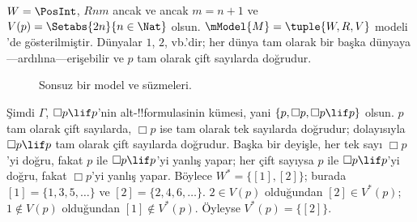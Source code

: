 \documentclass[../../../include/open-logic-section]{subfiles}
\begin{document}
\begin{ex}
  $W = \PosInt$, $Rnm$ ancak ve ancak $m = n + 1$ ve
  $V(p) = \Setabs{2n}{n \in \Nat}$ olsun. $\mModel{M} = \tuple{W, R, V}$
  modeli 'de gösterilmiştir. Dünyalar $1$, $2$,
  vb.'dir; her dünya tam olarak bir başka dünyaya---ardılına---erişebilir
  ve $p$ tam olarak çift sayılarda doğrudur.

  \begin{figure}
    \centering

    \caption{Sonsuz bir model ve süzmeleri.}
  \end{figure}

  Şimdi $\Gamma$, $\Box p \lif p$'nin alt-!!{formula}s{}inin kümesi, yani
  $\{p, \Box p, \Box p \lif p\}$ olsun. $p$ tam olarak çift sayılarda,
  $\Box p$ ise tam olarak tek sayılarda doğrudur; dolayısıyla
  $\Box p \lif p$ tam olarak çift sayılarda doğrudur. Başka bir deyişle,
  her tek sayı $\Box p$'yi doğru, fakat $p$ ile $\Box p \lif p$'yi yanlış
  yapar; her çift sayıysa $p$ ile $\Box p \lif p$'yi doğru, fakat
  $\Box p$'yi yanlış yapar. Böylece $W^* = \{ [1], [2] \}$; burada
  $[1] = \{1, 3, 5, \dots\}$ ve $[2] = \{2, 4, 6, \dots\}$.
  $2 \in V(p)$ olduğundan $[2] \in V^*(p)$; $1 \notin V(p)$ olduğundan
  $[1] \notin V^*(p)$. Öyleyse $V^*(p) = \{[2]\}$.


\end{ex}
\end{document}
